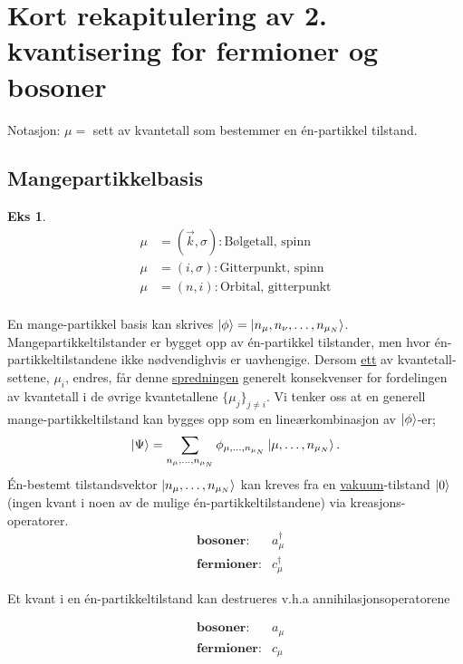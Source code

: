 \section{Kort rekapitulering av 2. kvantisering for fermioner og bosoner}

Notasjon: $ \mu = $ sett av kvantetall som bestemmer en én-partikkel tilstand.


\subsection{Mangepartikkelbasis}
\newtheorem{theorem}{Eks}
\begin{theorem}


\begin{align*}
\mu &= (\vec{k}, \sigma):\text{Bølgetall, spinn} \\
\mu &= (i, \sigma) : \text{Gitterpunkt, spinn} \\
\mu &= (n, i) : \text{Orbital, gitterpunkt} \\
\end{align*}

\end{theorem}

En mange-partikkel basis kan skrives $\ket{\phi} = \ket{n_{\mu}, n_{\nu}, \dots, n_{\mu_N}}$. Mangepartikkeltilstander er bygget opp av én-partikkel tilstander, men hvor én-partikkeltilstandene ikke nødvendighvis er uavhengige. Dersom \underline{ett} av kvantetall-settene, $\mu_i$, endres, får denne \underline{spredningen} generelt konsekvenser for fordelingen av kvantetall i de øvrige kvantetallene $\{\mu_j\}_{j\ne i}$.
Vi tenker oss at en generell mange-partikkeltilstand kan bygges opp som en lineærkombinasjon av $\ket{\phi}$-er;
\begin{equation}
\ket{\Psi} = \sum_{n_{\mu},\dots, n_{\mu_N}}\phi_{{\mu},\dots, n_{\mu_N}}\ket{{\mu},\dots, n_{\mu_N}}.
\end{equation}
Én-bestemt tilstandsvektor $\ket{n_{\mu},\dots, n_{\mu_N}}$ kan kreves fra en \underline{vakuum}-tilstand $\ket{0}$ (ingen kvant i noen av de mulige én-partikkeltilstandene) via kreasjons-operatorer.
\begin{align*}
&\textbf{bosoner}: &a_\mu^\dagger \\ 
&\textbf{fermioner}: &c_\mu^\dagger
\end{align*}


Et kvant i en én-partikkeltilstand kan destrueres  v.h.a annihilasjonsoperatorene

\begin{align*}
&\textbf{bosoner}: &a_\mu \\ 
&\textbf{fermioner}: &c_\mu
\end{align*}


